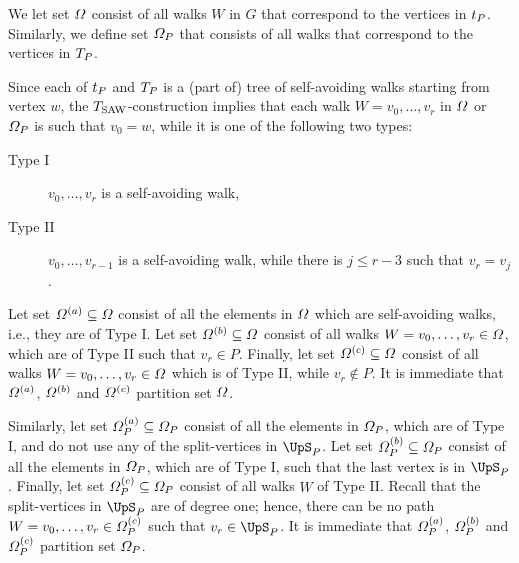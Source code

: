 \documentclass[11pt,reqno]{amsart}
\numberwithin{equation}{section}
\newcommand{\blue}[1]{{\color{blue}#1}}
\newcommand{\bostonuniversityred}[1]{{\color{bostonuniversityred}#1}}
\newcommand{\electricviolet}[1]{{\color{electricviolet}#1}}
\newcommand{\goldenbrown}[1]{{\color{goldenbrown}#1}}
\newcommand{\red}[1]{{\color{red}#1}}
\newcommand{\Tsaw}{T_{\rm SAW}}
\renewcommand{\blue}[1]{#1}
\renewcommand{\bostonuniversityred}[1]{#1}
\renewcommand{\electricviolet}[1]{#1}
\renewcommand{\goldenbrown}[1]{#1}
\renewcommand{\red}[1]{#1}
\newcommand{\kP}{\goldenbrown{P}}
\newcommand{\kr}{\bostonuniversityred{r}}%
\newcommand{\kv}{\electricviolet{v}}
\newcommand{\kW}{\blue{W}}
\newcommand{\kw}{\blue{w}}
\renewcommand{\kP}{P}
\renewcommand{\kr}{r}
\renewcommand{\kv}{v}
\renewcommand{\kW}{W}
\renewcommand{\kw}{w}
\begin{document}
We let set $\Omega$ consist of all walks $\kW$ in $G$   that correspond to the vertices in  $\STw_{\kP}$. Similarly, we define set 
$\sawpaths_{\kP}$ that consists of all walks that correspond to the vertices in $\XTPw$.



Since each of $\STw_{\kP}$ and $\XTPw$ is a (part of)  tree of self-avoiding walks starting from vertex $\kw$, 
the $\Tsaw$-construction implies that each walk $\kW=\kv_0, \ldots, \kv_{\kr}$ in $\Omega$ or $\sawpaths_{\kP}$ 
is such that $\kv_0=\kw$, while it is one  of the following two types:
\begin{description}
\item[Type I] $\kv_0, \ldots, \kv_{\kr}$ is a self-avoiding walk, \label{TsawTypeAWalk}
\item[Type II] $\kv_0, \ldots, \kv_{\kr-1}$ is a self-avoiding walk, while there is $j\leq \kr-3$ such that $\kv_{\kr}=\kv_{j}$. \label{TsawTypeBWalk}
\end{description}
 
Let set $\Omega^{(a)}\subseteq \Omega$ consist of all the elements in $\Omega$ which are 
self-avoiding walks,  i.e., they are of Type I.  Let set $\Omega^{(b)}\subseteq \Omega$ consist of  all 
walks $\kW=\kv_0, \ldots, \kv_{\kr} \in \sawpaths$, which  are of Type II such that $\kv_{\kr}\in \kP$.  Finally, 
let set $\Omega^{(c)}\subseteq \Omega$ consist of all walks $\kW=\kv_0, \ldots, \kv_{\kr} \in \sawpaths$ 
which  is of Type II, while  $\kv_{\kr}\notin \kP$. It is immediate that $\Omega^{(a)}$, $\Omega^{(b)}$ 
and $\Omega^{(c)}$ partition  set $\Omega$. 




Similarly, let set $\sawpaths^{(a)}_{\kP} \subseteq \sawpaths_{\kP}$ consist of all the elements in 
$\sawpaths_{\kP}$,  which are of Type I,  and do not use any of the split-vertices in $\ssplit_{\kP}$. Let 
set  $\sawpaths^{(b)}_{\kP}\subseteq \sawpaths_{\kP}$ consist of all the elements in $\sawpaths_{\kP}$, 
which  are of Type I, such that the last vertex is in $\ssplit_{\kP}$. Finally, let set 
$\sawpaths^{(c)}_{\kP}\subseteq \sawpaths_{\kP}$ consist of all walks $\kW$  of Type II.
Recall that the split-vertices in $\ssplit_{\kP}$ are of degree one; hence,  there can be no path  
$\kW=\kv_0, \ldots, \kv_{\kr} \in  \sawpaths^{(c)}_{\kP}$  such that $\kv_{\kr}\in \ssplit_{\kP}$.
It is immediate  that  $\sawpaths^{(a)}_{\kP}$, $\sawpaths^{(b)}_{\kP}$ and $\sawpaths^{(c)}_{\kP}$ 
partition set $\sawpaths_{\kP}$. 
\end{document}
